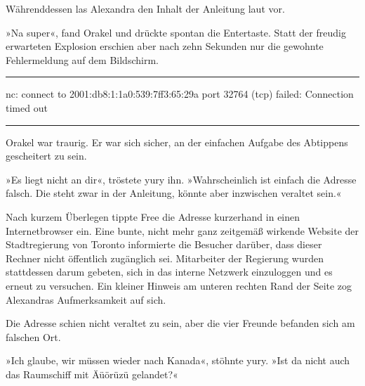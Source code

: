 Währenddessen las Alexandra den Inhalt der Anleitung laut vor.


»Na super«, fand Orakel und drückte spontan die Entertaste. Statt der freudig erwarteten Explosion erschien aber nach zehn Sekunden nur die gewohnte Fehlermeldung auf dem Bildschirm.

\noindent \parbox{\textwidth}{ \vspace{3ex} \hrule \vspace{3ex}

    \begin{tiny}
    \begin{ttfamily}

\noindent nc: connect to 2001:db8:1:1a0:539:7ff3:65:29a port 32764 (tcp) failed: Connection timed out

    \end{ttfamily}
    \end{tiny}

\vspace{3ex} \hrule \vspace{3ex} }

Orakel war traurig. Er war sich sicher, an der einfachen Aufgabe des Abtippens gescheitert zu sein.

»Es liegt nicht an dir«, tröstete yury ihn. »Wahrscheinlich ist einfach die Adresse falsch. Die steht zwar in der Anleitung, könnte aber inzwischen veraltet sein.«

Nach kurzem Überlegen tippte Free die Adresse kurzerhand in einen Internetbrowser ein. Eine bunte, nicht mehr ganz zeitgemäß wirkende Website der Stadtregierung von Toronto informierte die Besucher darüber, dass dieser Rechner nicht öffentlich zugänglich sei. Mitarbeiter der Regierung wurden stattdessen darum gebeten, sich in das interne Netzwerk einzuloggen und es erneut zu versuchen. Ein kleiner Hinweis am unteren rechten Rand der Seite zog Alexandras Aufmerksamkeit auf sich.


Die Adresse schien nicht veraltet zu sein, aber die vier Freunde befanden sich am falschen Ort.

»Ich glaube, wir müssen wieder nach Kanada«, stöhnte yury. »Ist da nicht auch das Raumschiff mit Äüörüzü gelandet?«

